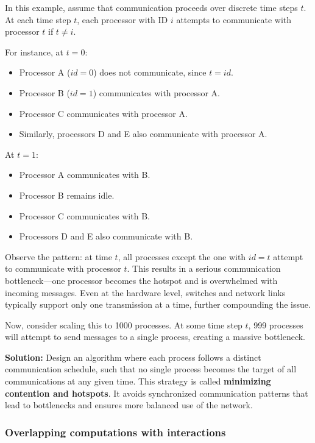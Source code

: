 \documentclass[12pt]{book}
\begin{document}
In this example, assume that communication proceeds over discrete time steps $t$. At each time step $t$, each processor with ID $i$ attempts to communicate with processor $t$ if $t \ne i$.

For instance, at $t = 0$:
\begin{itemize}
    \item Processor A ($id = 0$) does not communicate, since $t = id$.
    \item Processor B ($id = 1$) communicates with processor A.
    \item Processor C communicates with processor A.
    \item Similarly, processors D and E also communicate with processor A.
\end{itemize}

At $t = 1$:
\begin{itemize}
    \item Processor A communicates with B.
    \item Processor B remains idle.
    \item Processor C communicates with B.
    \item Processors D and E also communicate with B.
\end{itemize}

Observe the pattern: at time $t$, all processes except the one with $id = t$ attempt to communicate with processor $t$. This results in a serious communication bottleneck—one processor becomes the hotspot and is overwhelmed with incoming messages. Even at the hardware level, switches and network links typically support only one transmission at a time, further compounding the issue.

Now, consider scaling this to 1000 processes. At some time step $t$, 999 processes will attempt to send messages to a single process, creating a massive bottleneck.

\textbf{Solution:} Design an algorithm where each process follows a distinct communication schedule, such that no single process becomes the target of all communications at any given time. This strategy is called \textbf{minimizing contention and hotspots}. It avoids synchronized communication patterns that lead to bottlenecks and ensures more balanced use of the network.

\subsubsection{Overlapping computations with interactions}
\end{document}

